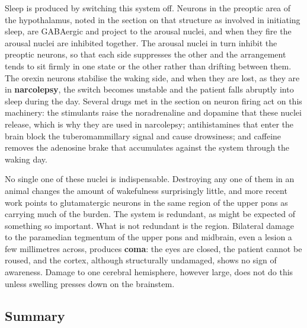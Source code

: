 \documentclass[11pt]{article}
\begin{document}
Sleep is produced by switching this system off. Neurons in the preoptic area of the hypothalamus, noted in the section on that structure as involved in initiating sleep, are GABAergic and project to the arousal nuclei, and when they fire the arousal nuclei are inhibited together. The arousal nuclei in turn inhibit the preoptic neurons, so that each side suppresses the other and the arrangement tends to sit firmly in one state or the other rather than drifting between them. The orexin neurons stabilise the waking side, and when they are lost, as they are in \textbf{narcolepsy}, the switch becomes unstable and the patient falls abruptly into sleep during the day. Several drugs met in the section on neuron firing act on this machinery: the stimulants raise the noradrenaline and dopamine that these nuclei release, which is why they are used in narcolepsy; antihistamines that enter the brain block the tuberomammillary signal and cause drowsiness; and caffeine removes the adenosine brake that accumulates against the system through the waking day.

No single one of these nuclei is indispensable. Destroying any one of them in an animal changes the amount of wakefulness surprisingly little, and more recent work points to glutamatergic neurons in the same region of the upper pons as carrying much of the burden. The system is redundant, as might be expected of something so important. What is not redundant is the region. Bilateral damage to the paramedian tegmentum of the upper pons and midbrain, even a lesion a few millimetres across, produces \textbf{coma}: the eyes are closed, the patient cannot be roused, and the cortex, although structurally undamaged, shows no sign of awareness. Damage to one cerebral hemisphere, however large, does not do this unless swelling presses down on the brainstem.

\subsection{Summary}
\end{document}
